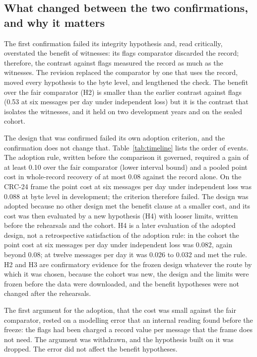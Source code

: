 \subsection{What changed between the two confirmations, and why it matters}
The first confirmation failed its integrity hypothesis and, read critically, overstated the benefit of witnesses: its flags comparator discarded the record; therefore, the contrast against flags measured the record as much as the witnesses. The revision replaced the comparator by one that uses the record, moved every hypothesis to the byte level, and lengthened the check. The benefit over the fair comparator (H2) is smaller than the earlier contrast against flags (0.53 at six messages per day under independent loss) but it is the contrast that isolates the witnesses, and it held on two development years and on the sealed cohort.

The design that was confirmed failed its own adoption criterion, and the confirmation does not change that. Table~\ref{tab:timeline} lists the order of events. The adoption rule, written before the comparison it governed, required a gain of at least 0.10 over the fair comparator (lower interval bound) and a pooled point cost in whole-record recovery of at most 0.08 against the record alone. On the CRC-24 frame the point cost at six messages per day under independent loss was 0.088 at byte level in development; the criterion therefore failed. The design was adopted because no other design met the benefit clause at a smaller cost, and its cost was then evaluated by a new hypothesis (H4) with looser limits, written before the rehearsals and the cohort. H4 is a later evaluation of the adopted design, not a retrospective satisfaction of the adoption rule: in the cohort the point cost at six messages per day under independent loss was 0.082, again beyond 0.08; at twelve messages per day it was 0.026 to 0.032 and met the rule. H2 and H3 are confirmatory evidence for the frozen design whatever the route by which it was chosen, because the cohort was new, the design and the limits were frozen before the data were downloaded, and the benefit hypotheses were not changed after the rehearsals.

The first argument for the adoption, that the cost was small against the fair comparator, rested on a modelling error that an internal reading found before the freeze: the flags had been charged a record value per message that the frame does not need. The argument was withdrawn, and the hypothesis built on it was dropped. The error did not affect the benefit hypotheses.

